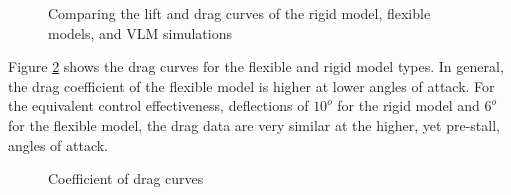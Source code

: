 \documentclass[11pt]{ucthesis}
\begin{document}
\begin{figure}[thpb]
\hfill
{}
\hfill
{}
\hfill
\caption{Comparing the lift and drag curves of the rigid model, flexible models, and VLM simulations}
\label{fig:6}
\end{figure}

Figure \ref{fig:CD} shows the drag curves for the flexible and rigid model types. In general, the drag coefficient of the flexible model is higher at lower angles of attack.  For the equivalent control effectiveness, deflections of $10^o$ for the rigid model and $6^o$ for the flexible model, the drag data are very similar at the higher, yet pre-stall, angles of attack. 

\begin{figure}[thpb]
\hfill
{}
\hfill
{}
\hfill
\caption{Coefficient of drag curves}
\label{fig:CD}
\end{figure}
\end{document}
